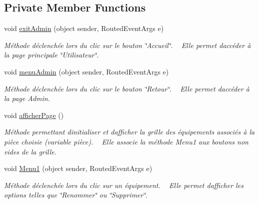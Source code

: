 \subsection*{Private Member Functions}
\begin{DoxyCompactItemize}
\item 
void \hyperlink{class_my_domotik_1_1_gestion_equipements_ae90ec34d78bceea7a04ca5e171885792}{exit\+Admin} (object sender, Routed\+Event\+Args e)
\begin{DoxyCompactList}\small\item\em Méthode déclenchée lors du clic sur le bouton \char`\"{}\+Accueil\char`\"{}. ~\newline
Elle permet d\textquotesingle{}accéder à la page principale \char`\"{}\+Utilisateur\char`\"{}. \end{DoxyCompactList}\item 
void \hyperlink{class_my_domotik_1_1_gestion_equipements_a6e1cc6b674a359e05b305abdb446a28a}{menu\+Admin} (object sender, Routed\+Event\+Args e)
\begin{DoxyCompactList}\small\item\em Méthode déclenchée lors du clic sur le bouton \char`\"{}\+Retour\char`\"{}. ~\newline
Elle permet d\textquotesingle{}accéder à la page Admin. \end{DoxyCompactList}\item 
void \hyperlink{class_my_domotik_1_1_gestion_equipements_ae330493e4c44ad1042f854f04100ec05}{afficher\+Page} ()
\begin{DoxyCompactList}\small\item\em Méthode permettant d\textquotesingle{}initialiser et d\textquotesingle{}afficher la grille des équipements associés à la pièce choisie (variable pièce). ~\newline
Elle associe la méthode Menu1 aux boutons non vides de la grille. ~\newline
\end{DoxyCompactList}\item 
void \hyperlink{class_my_domotik_1_1_gestion_equipements_ae7b1dfbd7a51d2e2ae61a3ef93b9f548}{Menu1} (object sender, Routed\+Event\+Args e)
\begin{DoxyCompactList}\small\item\em Méthode déclenchée lors du clic sur un équipement. ~\newline
Elle permet d\textquotesingle{}afficher les options telles que \char`\"{}\+Renommer\char`\"{} ou \char`\"{}\+Supprimer\char`\"{}. \end{DoxyCompactList}\item 

\end{DoxyCompactItemize}
